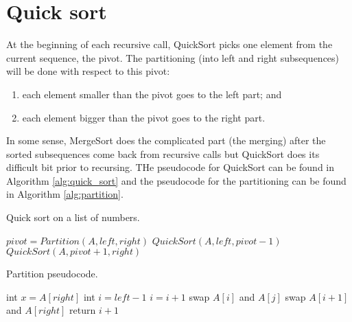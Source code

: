 \section{Quick sort}

\begin{definition}
    At the beginning of each recursive call, QuickSort picks one element from the current sequence, the pivot. The partitioning (into left and right subsequences) will be done with respect to this pivot:
    \begin{enumerate}
        \item each element smaller than the pivot goes to the left part; and
        \item each element bigger than the pivot goes to the right part.
    \end{enumerate}
    In some sense, MergeSort does the complicated part (the merging) after the sorted subsequences come back from recursive calls but QuickSort does its difficult bit prior to recursing. THe pseudocode for QuickSort can be found in Algorithm \ref{alg:quick_sort} and the pseudocode for the partitioning can be found in Algorithm \ref{alg:partition}.
\end{definition}

\begin{algorithm}
    \caption{Quick sort on a list of numbers.}
    \label{alg:quick_sort}
    \begin{algorithmic}
                \State $pivot = Partition(A, left, right)$
                \State $QuickSort(A, left, pivot - 1)$
                \State $QuickSort(A, pivot + 1, right)$
            \EndIf
        \EndProcedure
    \end{algorithmic}
\end{algorithm}

\begin{algorithm}
    \caption{Partition pseudocode.}
    \label{alg:partition}
    \begin{algorithmic}
            \State int $x=A[right]$
            \State int $i=left-1$
                    \State $i=i+1$
                    \State swap $A[i]$ and $A[j]$
                \EndIf
            \EndFor
            \State swap $A[i+1]$ and $A[right]$
            \State return $i+1$
        \EndProcedure
    \end{algorithmic}
\end{algorithm}
